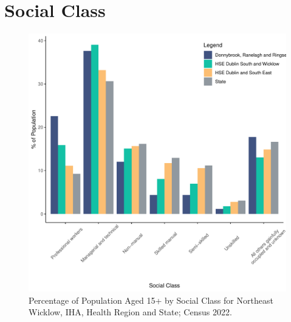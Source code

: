 \documentclass{article}
\begin{document}
\section{Social Class}\label{sect:SC}
\begin{figure}[H]
	\centering
	\includegraphics[width = 140mm]{../figures/SocialClassED.pdf}
	\caption{Percentage of Population Aged 15+ by Social Class for Northeast Wicklow, IHA, Health Region and State; Census 2022.}
	\label{fig:vbnv}
	\end{figure}
\end{document}
